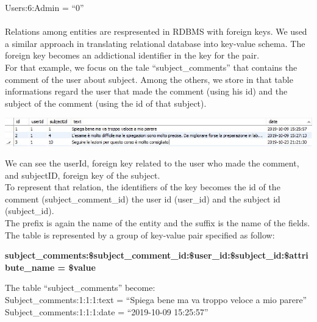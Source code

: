 \documentclass[a4paper, oneside]{article}
\begin{document}
Users:6:Admin = “0”\\
\vspace{3mm} \\
Relations among entities are respresented in RDBMS with foreign keys. We used a similar approach in translating relational database into key-value schema. The foreign key becomes an addictional identifier in the key for the pair.\\
For that example, we focus on the tale “subject\_comments” that contains the comment of the user about subject. Among the others, we store in that table informations regard the user that made the comment (using his id) and the subject of the comment (using the id of that subject).\\
\begin{minipage}{\linewidth}
\begin{center}
\vspace{4mm}
\includegraphics[width = 1\textwidth]{./images/table/subject_comments.jpg} 
\vspace{2mm}
\label{fig:subjectCommTable}
\end{center}
\vspace{3mm}
\end{minipage}
We can see the userId, foreign key related to the user who made the comment, and subjectID, foreign key of the subject.\\
To represent that relation, the identifiers of the key becomes the id of the comment (subject\_comment\_id) the user id (user\_id) and the subject id (subject\_id).\\ The prefix is again the name of the entity and the suffix is the name of the fields. The table is represented by a group of key-value pair specified as follow:
\begin{center}
\textbf{subject\_comments:\$subject\_comment\_id:\$user\_id:\$subject\_id:\$attribute\_name = \$value}
\end{center}
\vspace{5mm}
The table “subject\_comments” become:
\vspace{2mm} \\
Subject\_comments:1:1:1:text = “Spiega bene ma va troppo veloce a mio parere”\\
Subject\_comments:1:1:1:date = “2019-10-09 15:25:57”\\
\end{document}
